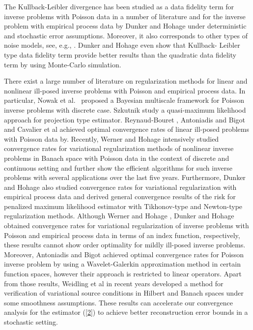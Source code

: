 \documentclass[10pt]{iopart}
\begin{document}
The Kullback-Leibler divergence has been studied as a data fidelity term for inverse problems with Poisson data in a number of literature 
\cite{antoniadis2006, Benning2011, Cavalier2002, Dunker2014, Hohage2013, Hohage2016, Tsybakov2009, Werner2012} and for the inverse problem with 
empirical process data by Dunker and Hohage \cite{Dunker2014} under deterministic and stochastic error assumptions. Moreover, it also 
corresponds to other types of noise models, see, e.g., \cite{Tsybakov2009}. Dunker and Hohage \cite{Dunker2014} even show that Kullback-
Leibler type data fidelity term provide better results than the quadratic data fidelity term by using Monte-Carlo simulation. 

There exist a large number of literature on regularization methods for linear and nonlinear ill-posed inverse problems with 
Poisson and empirical process data. In particular, Nowak et al.~\cite{Nowak2000} proposed a Bayesian multiscale framework for Poisson inverse 
problems with discrete case. Szkutnik \cite{Szkutnik2000} study a quasi-maximum likelihood approach for projection type estimator. Reynaud-Bouret
\cite{ReynaudBouret2003}, Antoniadis and Bigot \cite{antoniadis2006} and Cavalier et al \cite{Cavalier2002} achieved optimal convergence 
rates of linear ill-posed problems with Poisson data by. Recently, Werner and Hohage \cite{Hohage2013, Hohage2016, Werner2012} intensively studied
convergence rates for variational regularization methods of nonlinear inverse problems in Banach space with Poisson data in the context of discrete
and continuous setting and further show the efficient algorithms for such inverse problems with several applications over the last five years. 
Furthermore, Dunker and Hohage \cite{Dunker2014} also studied convergence rates for variational regularization with empirical process data
and derived general convergence results of the risk for penalized maximum likelihood estimator with Tikhonov-type and Newton-type regularization
methods. Although Werner and Hohage \cite{Werner2012}, Dunker and Hohage \cite{Dunker2014} obtained convergence rates for 
variational regularization of inverse problems with Poisson and empirical process data in terms of an index function, respectively, 
these results cannot show order optimality for mildly ill-posed inverse problems. Moreover, Antoniadis 
and Bigot \cite{antoniadis2006} achieved optimal convergence rates for Poisson inverse problem by using a Wavelet-Galerkin approximation method in
certain function spaces, however their approach is restricted to linear operators.  Apart from those results, Weidling et al \cite{Weidling2018} in recent years developed a method for verification of
variational source conditions in Hilbert and Banach spaces under some smoothness assumptions. These results can accelerate our convergence analysis for the estimator (\ref{2}) to achieve better
reconstruction error bounds in a stochastic setting. 
\end{document}
